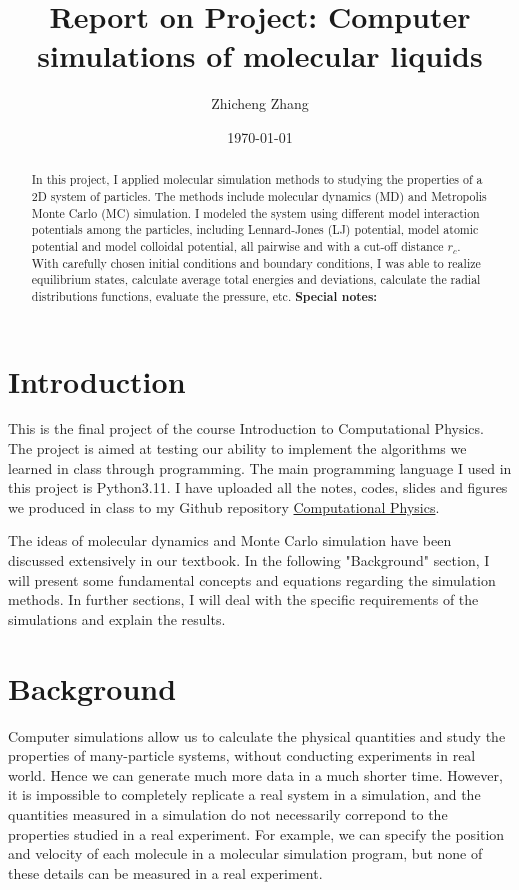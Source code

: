 \documentclass[letterpaper,12pt]{article}
\numberwithin{equation}{section}
\begin{document}
\title{Report on \textbf{Project: Computer simulations of molecular liquids}}
\author{Zhicheng Zhang}
\date{\today}
\maketitle

\begin{abstract}
In this project, I applied molecular simulation methods to studying the properties of a 2D system of particles. The methods include molecular dynamics (MD) and Metropolis Monte Carlo (MC) simulation. I modeled the system using different model interaction potentials among the particles, including Lennard-Jones (LJ) potential, model atomic potential and model colloidal potential, all pairwise and with a cut-off distance $r_c$. With carefully chosen initial conditions and boundary conditions, I was able to realize equilibrium states, calculate average total energies and deviations, calculate the radial distributions functions, evaluate the pressure, etc. \textbf{Special notes:} 
\end{abstract}


\section{Introduction}

This is the final project of the course Introduction to Computational Physics. The project is aimed at testing our ability to implement the algorithms we learned in class through programming. The main programming language I used in this project is Python3.11. I have uploaded all the notes, codes, slides and figures we produced in class to my Github repository \href{https://github.com/Tom20200112/comp_physics}{Computational Physics}.

The ideas of molecular dynamics and Monte Carlo simulation have been discussed extensively in our textbook. In the following "Background" section, I will present some fundamental concepts and equations regarding the simulation methods. In further sections, I will deal with the specific requirements of the simulations and explain the results.

\section{Background}

Computer simulations allow us to calculate the physical quantities and study the properties of many-particle systems, without conducting experiments in real world. Hence we can generate much more data in a much shorter time. However, it is impossible to completely replicate a real system in a simulation, and the quantities measured in a simulation do not necessarily correpond to 
the properties studied in a real experiment. For example, we can specify the position and velocity of each molecule in a molecular simulation program, but none of these details can be measured in a real experiment. 
\end{document}
